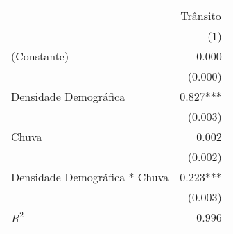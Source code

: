 \begin{tabular}{lr}
\toprule
                              & \multicolumn{1}{c}{Trânsito} \\ 
\cmidrule(lr){2-2} 
                              &                          (1) \\ 
\midrule
(Constante)                   &                        0.000 \\ 
                              &                      (0.000) \\ 
Densidade Demográfica         &                     0.827*** \\ 
                              &                      (0.003) \\ 
Chuva                         &                        0.002 \\ 
                              &                      (0.002) \\ 
Densidade Demográfica * Chuva &                     0.223*** \\ 
                              &                      (0.003) \\ 
\midrule
$R^2$                         &                        0.996 \\ 
\bottomrule
\end{tabular}
